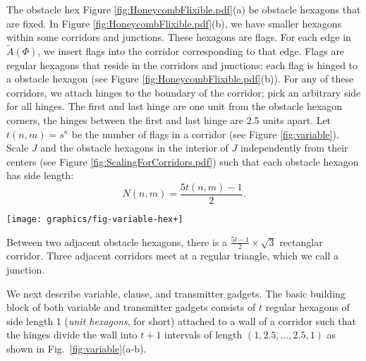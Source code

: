 \documentclass[10pt]{CSUNthesis}
\theoremstyle{plain}%
\theoremstyle{definition}
\theoremstyle{remark}
\begin{document}
The obstacle hex Figure \ref{fig:HoneycombFlixible.pdf}(a) be obstacle hexagons that are fixed.
In Figure \ref{fig:HoneycombFlixible.pdf}(b), we have smaller hexagons within some corridors and junctions.
These hexagons are flags.
For each edge in $\tilde{A}(\Phi)$, we insert flags into the corridor corresponding to that edge.
Flags are regular hexagons that reside in the corridors and junctions; each flag is hinged to a obstacle hexagon (see Figure \ref{fig:HoneycombFlixible.pdf}(b)).  
For any of these corridors, we attach hinges to the boundary of the corridor; pick an arbitrary side for all hinges.  
The first and last hinge are one unit from the obstacle hexagon corners, the hinges between the first and last hinge are 2.5 units apart.  
Let $t(n,m)=s^\kappa$ be the number of flags in a corridor (see Figure \ref{fig:variable}). 
Scale $J$ and the obstacle hexagons in the interior of $J$ independently from their centers (see Figure \ref{fig:ScalingForCorridors.pdf}) such that each obstacle hexagon has side length: $$N(n,m)=\frac{5t(n,m)-1}{2}.$$ 

\begin{minipage}{\linewidth}
\begin{center}
\texttt{[image: graphics/fig-variable-hex+]}
\label{fig:variable}
\end{center}
\end{minipage}

Between two adjacent obstacle hexagons, there is a $\frac{5t-1}{2}\times \sqrt{3}$ rectanglar corridor.  %
Three adjacent corridors meet at a regular triangle, which we call a junction. 

We next describe variable, clause, and transmitter gadgets.
The basic building block of both variable and transmitter gadgets consists of $t$ regular hexagons of side length 1 (\emph{unit hexagons}, for short) attached to a wall of a corridor such that the hinges divide the wall into $t+1$ intervals of length $(1,2.5,\ldots ,2.5,1)$ as shown in Fig.~\ref{fig:variable}(a-b). 
\end{document}
